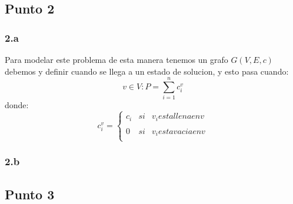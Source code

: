 \documentclass{article}
\begin{document}
\subsection*{Punto 2}

\subsubsection*{2.a}
Para modelar este problema de esta manera tenemos un grafo $G(V,E,c)$debemos y definir cuando se llega a un estado de solucion, y esto pasa cuando:
\begin{equation}
v\in V: P=\sum_{i=1}^{n} c^v_i
\end{equation}
donde: 
\begin{equation}
c^v_i= \left\{ \begin{array}{lcc}
             c_i &   si  & v_i esta llena en v \\
             \\ 0 &  si & v_i esta vacia en v \\
              
             \end{array}
   \right.
\end{equation} 
\subsubsection*{2.b}



\subsection*{Punto 3}
\end{document}
